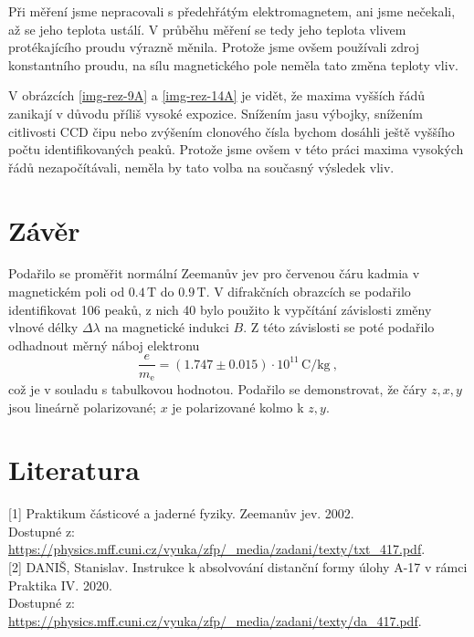 \documentclass[10pt,a4paper]{article}
\renewcommand{\U}[1]{\ensuremath{\,\mathrm{#1}}}
\newcommand{\°}{\degree}
\begin{document}
Při měření jsme nepracovali s předehřátým elektromagnetem, ani jsme nečekali, až se jeho teplota ustálí. V průběhu měření se tedy jeho teplota vlivem protékajícího proudu výrazně měnila. Protože jsme ovšem používali zdroj konstantního proudu, na sílu magnetického pole neměla tato změna teploty vliv.

V obrázcích \ref{img-rez-9A} a \ref{img-rez-14A} je vidět, že maxima vyšších řádů zanikají v důvodu příliš vysoké expozice. Snížením jasu výbojky, snížením citlivosti CCD čipu nebo zvýšením clonového čísla bychom dosáhli ještě vyššího počtu identifikovaných peaků. Protože jsme ovšem v této práci maxima vysokých řádů nezapočítávali, neměla by tato volba na současný výsledek vliv.



\section{Závěr}
Podařilo se proměřit normální Zeemanův jev pro červenou čáru kadmia v magnetickém poli od $0.4 \U{T}$ do $0.9 \U{T}$. V difrakčních obrazcích se podařilo identifikovat 106 peaků, z nich 40 bylo použito k vypčítání závislosti změny vlnové délky $\Delta\lambda$ na magnetické indukci $B$. Z této závislosti se poté podařilo odhadnout měrný náboj elektronu
\begin{equation*}
    \frac{e}{m_{\mathrm{e}}}
    = (1.747 \pm 0.015) \cdot 10^{11} \U{C / kg} \: ,
\end{equation*}
což je v souladu s tabulkovou hodnotou. Podařilo se demonstrovat, že čáry $z,x,y$ jsou lineárně polarizované; $x$ je polarizované kolmo k $z,y$.

\section{Literatura}
[1] Praktikum částicové a jaderné fyziky. Zeemanův jev. 2002. \\ Dostupné z: \url{https://physics.mff.cuni.cz/vyuka/zfp/_media/zadani/texty/txt_417.pdf}.
\\[10pt]
[2] DANIŠ, Stanislav. Instrukce k absolvování distanční formy úlohy A-17 v rámci Praktika IV. 2020. \\ Dostupné z: \url{https://physics.mff.cuni.cz/vyuka/zfp/_media/zadani/texty/da_417.pdf}.
\end{document}
